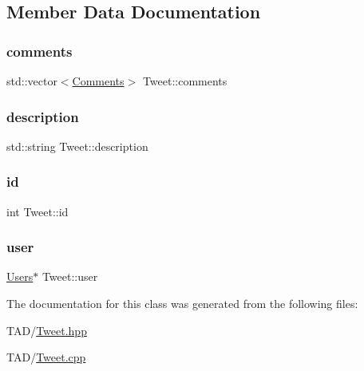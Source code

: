 \subsection{Member Data Documentation}
\mbox{\label{class_tweet_a710dd5d27fc8eb0e068e5dd334634d57}} 
\subsubsection{\texorpdfstring{comments}{comments}}
{\footnotesize\ttfamily std\+::vector$<$\hyperlink{class_comments}{Comments}$>$ Tweet\+::comments\hspace{0.3cm}{\ttfamily [private]}}

\mbox{\label{class_tweet_abc8726cb97ee5d2447dd30b35d52b9d1}} 
\subsubsection{\texorpdfstring{description}{description}}
{\footnotesize\ttfamily std\+::string Tweet\+::description\hspace{0.3cm}{\ttfamily [private]}}

\mbox{\label{class_tweet_a3e7ab9402d5ed1126a432b266c2b9f22}} 
\subsubsection{\texorpdfstring{id}{id}}
{\footnotesize\ttfamily int Tweet\+::id\hspace{0.3cm}{\ttfamily [private]}}

\mbox{\label{class_tweet_a084d33216fa5d5a1e7dfe1a3e1730fdd}} 
\subsubsection{\texorpdfstring{user}{user}}
{\footnotesize\ttfamily \hyperlink{class_users}{Users}$\ast$ Tweet\+::user\hspace{0.3cm}{\ttfamily [private]}}



The documentation for this class was generated from the following files\+:\begin{DoxyCompactItemize}
\item 
T\+A\+D/\hyperlink{_tweet_8hpp}{Tweet.\+hpp}\item 
T\+A\+D/\hyperlink{_tweet_8cpp}{Tweet.\+cpp}\end{DoxyCompactItemize}
